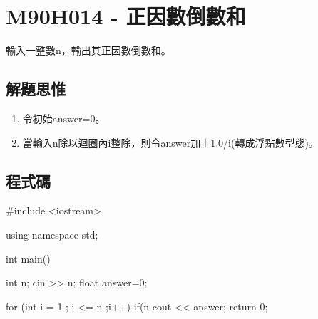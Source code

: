 \section{M90H014 - 正因數倒數和}
輸入一整數n，輸出其正因數倒數和。
\subsection{解題思惟}
\begin{enumerate}
	\item 令初始answer=0。
	\item 當輸入n除以迴圈內i整除，則令answer加上1.0/i(轉成浮點數型態)。
\end{enumerate}
\subsection{程式碼}
\begin{cppcode}
#include <iostream>

using namespace std;

int main()
{
	int n;
	cin >> n;
	float answer=0;
	
	for (int i = 1 ; i <= n ;i++) {
		if(n %
	}
	cout << answer;
	return 0;
}
\end{cppcode}
